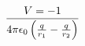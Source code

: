 \documentclass[preview]{standalone}
\begin{document}
\begin{align*}
V  =  - 1 \over {4 \pi\epsilon_0}  \left( \frac{q}{r_1} - \frac{q}{r_2} \right)
\end{align*}
\end{document}
